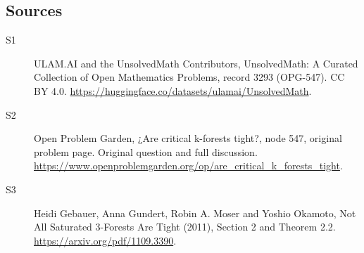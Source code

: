 \documentclass[11pt]{article}
\begin{document}
\subsection{Sources}
\begin{description}
\item[\hypertarget{source:3293:1}{S1}] ULAM.AI and the UnsolvedMath Contributors, UnsolvedMath: A Curated Collection of Open Mathematics Problems, record 3293 (OPG-547). CC BY 4.0. \url{https://huggingface.co/datasets/ulamai/UnsolvedMath}.
\item[\hypertarget{source:3293:2}{S2}] Open Problem Garden, ¿Are critical k-forests tight?, node 547, original problem page. Original question and full discussion. \url{https://www.openproblemgarden.org/op/are_critical_k_forests_tight}.
\item[\hypertarget{source:3293:3}{S3}] Heidi Gebauer, Anna Gundert, Robin A. Moser and Yoshio Okamoto, Not All Saturated 3-Forests Are Tight (2011), Section 2 and Theorem 2.2. \url{https://arxiv.org/pdf/1109.3390}.
\end{description}
\label{end:3293}
\end{document}
